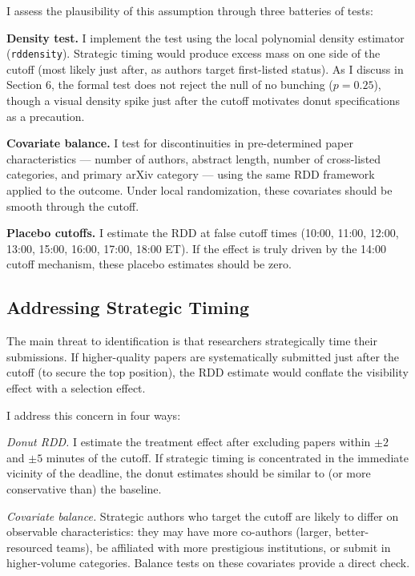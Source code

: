 \documentclass[12pt]{article}
\begin{document}
I assess the plausibility of this assumption through three batteries of tests:

\textbf{Density test.} I implement the \citet{mccrary2008} test using the \citet{cattaneo2020inference} local polynomial density estimator (\texttt{rddensity}). Strategic timing would produce excess mass on one side of the cutoff (most likely just after, as authors target first-listed status). As I discuss in Section 6, the formal test does not reject the null of no bunching ($p = 0.25$), though a visual density spike just after the cutoff motivates donut specifications as a precaution.

\textbf{Covariate balance.} I test for discontinuities in pre-determined paper characteristics --- number of authors, abstract length, number of cross-listed categories, and primary arXiv category --- using the same RDD framework applied to the outcome. Under local randomization, these covariates should be smooth through the cutoff.

\textbf{Placebo cutoffs.} I estimate the RDD at false cutoff times (10:00, 11:00, 12:00, 13:00, 15:00, 16:00, 17:00, 18:00 ET). If the effect is truly driven by the 14:00 cutoff mechanism, these placebo estimates should be zero.

\subsection{Addressing Strategic Timing}

The main threat to identification is that researchers strategically time their submissions. If higher-quality papers are systematically submitted just after the cutoff (to secure the top position), the RDD estimate would conflate the visibility effect with a selection effect.

I address this concern in four ways:

\textit{Donut RDD.} I estimate the treatment effect after excluding papers within $\pm 2$ and $\pm 5$ minutes of the cutoff. If strategic timing is concentrated in the immediate vicinity of the deadline, the donut estimates should be similar to (or more conservative than) the baseline.

\textit{Covariate balance.} Strategic authors who target the cutoff are likely to differ on observable characteristics: they may have more co-authors (larger, better-resourced teams), be affiliated with more prestigious institutions, or submit in higher-volume categories. Balance tests on these covariates provide a direct check.
\end{document}
